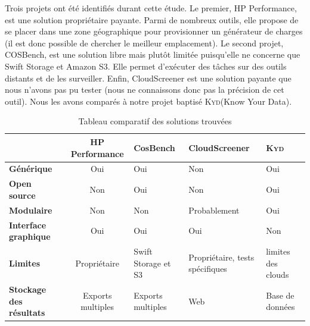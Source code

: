 \documentclass[10pt]{article}
\newcommand{\KYD}{\textsc{Kyd}\xspace}
\begin{document}
Trois projets ont été identifiés durant cette étude. Le premier, HP
Performance, est une solution propriétaire payante. Parmi de nombreux
outils, elle propose de se placer dans une zone géographique pour
provisionner un générateur de charges (il est donc possible de
chercher le meilleur emplacement). Le second projet, COSBench, est une
solution libre mais plutôt limitée puisqu’elle ne concerne que Swift
Storage et Amazon S3. Elle permet d'exécuter des tâches sur des outils
distants et de les surveiller. Enfin, CloudScreener est une solution
payante que nous n’avons pas pu tester (nous ne connaissons donc pas
la précision de cet outil). Nous les avons comparés à notre projet
baptisé \KYD (Know Your Data).
\newpage

\begin{table}[h]
\caption{Tableau comparatif des solutions trouvées}
\renewcommand{\arraystretch}{1.5}
\begin{center}
\begin{tabular}{|p{2cm}|c|p{2cm}|p{3cm}|p{2cm}|}
 \hline
     & \bf HP Performance & \bf CosBench & \bf CloudScreener & \bf \KYD  \\
 \hline
 \bf\centering Générique & Oui & Oui & Non & Oui \\
 \hline
  \bf\centering Open source & Non & Oui & Non & Oui \\
 \hline
  \bf\centering Modulaire & Non & Non & Probablement & Oui \\
 \hline
  \bf\centering Interface graphique & Oui & Oui & Oui & Non \\
 \hline
  \bf\centering Limites & Propriétaire & Swift Storage et S3 & Propriétaire, tests spécifiques & limites des clouds \\
 \hline
  \bf\centering Stockage des résultats & Exports multiples & Exports multiples & Web & Base de données \\
 \hline
\end{tabular}
\end{center}
\end{table}
\end{document}
